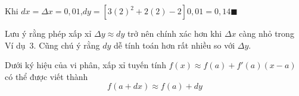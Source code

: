 \begin{minipage}[t]{0.70\textwidth}
    \vspace{0.45em}
    \noindent Khi $dx = \Delta x = 0{,}01$,\hfill $dy = [3(2)^2 + 2(2) - 2]0{,}01 = 0{,}14$\hfill{\color{stewartcyan}$\blacksquare$}

    \vspace{0.45cm}
    Lưu ý rằng phép xấp xỉ $\Delta y \approx dy$ trở nên chính xác hơn khi $\Delta x$ càng nhỏ trong Ví dụ~3. Cũng chú ý rằng $dy$ dễ tính toán hơn rất nhiều so với $\Delta y$.

    \vspace{0.25cm}
    Dưới ký hiệu của vi phân, xấp xỉ tuyến tính $f(x) \approx f(a) + f'(a)(x - a)$ có thể được viết thành
    \[
    f(a + dx) \approx f(a) + dy
    \]
\end{minipage}
